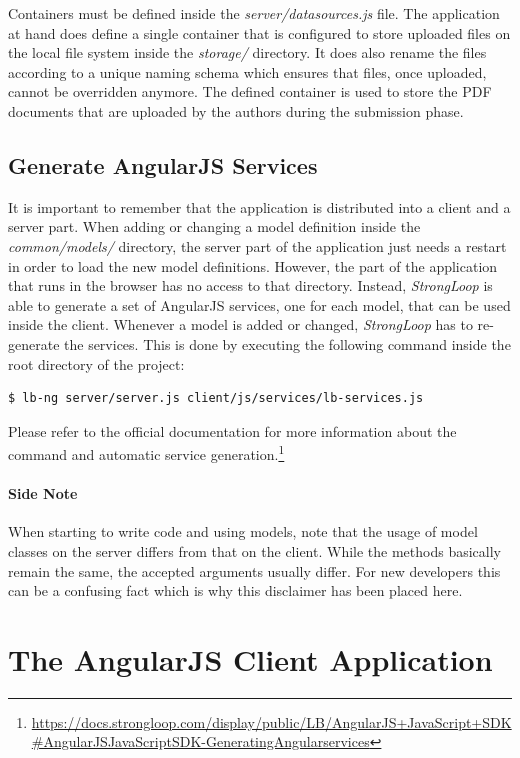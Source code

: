\documentclass[nochapterpage,nopartpage,noheadingspace,numbersubsubsec,bigchapter,colorback,accentcolor=tud9c,10pt]{tudreport}
\begin{document}
    Containers must be defined inside the \emph{server/datasources.js} file. The application at hand does define a single container that is configured to store uploaded files on the local file system inside the \emph{storage/} directory. It does also rename the files according to a unique naming schema which ensures that files, once uploaded, cannot be overridden anymore. The defined container is used to store the PDF documents that are uploaded by the authors during the submission phase.

  \subsection{Generate AngularJS Services}
  \label{sec:tech:implementation:strongloop:genlib}

    It is important to remember that the application is distributed into a client and a server part. When adding or changing a model definition inside the \emph{common/models/} directory, the server part of the application just needs a restart in order to load the new model definitions. However, the part of the application that runs in the browser has no access to that directory. Instead, \emph{StrongLoop} is able to generate a set of AngularJS services, one for each model, that can be used inside the client. Whenever a model is added or changed, \emph{StrongLoop} has to re-generate the services. This is done by executing the following command inside the root directory of the project:
        \begin{lstlisting}[language=bash]
    $ lb-ng server/server.js client/js/services/lb-services.js
        \end{lstlisting}
    Please refer to the official documentation for more information about the command and automatic service generation.\footnote{\url{https://docs.strongloop.com/display/public/LB/AngularJS+JavaScript+SDK\#AngularJSJavaScriptSDK-GeneratingAngularservices}}

  \paragraph{Side Note}
    When starting to write code and using models, note that the usage of model classes on the server differs from that on the client. While the methods basically remain the same, the accepted arguments usually differ. For new developers this can be a confusing fact which is why this disclaimer has been placed here.

  \section{The AngularJS Client Application}
  \label{sec:tech:implementation:angularjs}
\end{document}
